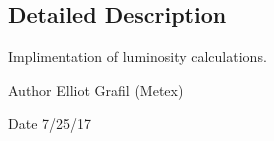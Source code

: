 \subsection{Detailed Description}
Implimentation of luminosity calculations. 

\begin{DoxyAuthor}{Author}
Elliot Grafil (Metex) 
\end{DoxyAuthor}
\begin{DoxyDate}{Date}
7/25/17 
\end{DoxyDate}

